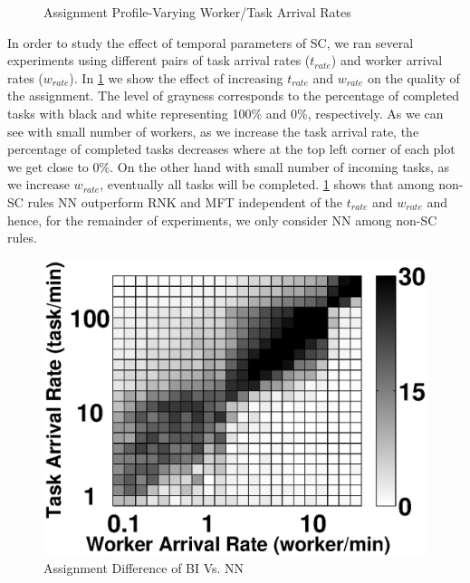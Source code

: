 \begin{figure}[h]
{    }
    \vspace{-0.15in}
    \caption{\small{Assignment Profile-Varying Worker/Task Arrival Rates}}
    \label{fig:tw_rate}
\end{figure}

In order to study the effect of temporal parameters of SC, we ran several experiments using different pairs of task arrival rates ($t_{rate}$) and worker arrival rates ($w_{rate}$). In \cref{fig:tw_rate} we show the effect of increasing $t_{rate}$ and $w_{rate}$ on the quality of the assignment. The level of grayness corresponds to the percentage of completed tasks with black and white representing 100\% and 0\%, respectively. As we can see with small number of workers, as we increase the task arrival rate, the percentage of completed tasks decreases where at the top left corner of each plot we get close to 0\%. On the other hand with small number of incoming tasks, as we increase $w_{rate}$, eventually all tasks will be completed. \cref{fig:tw_rate} shows that among non-SC rules NN outperform RNK and MFT independent of the $t_{rate}$ and $w_{rate}$ and hence, for the remainder of experiments, we only consider NN among non-SC rules.\\

\begin{figure}[h]
	\centering
	\includegraphics[width = 0.65\columnwidth]{figures/bi_nn.eps}
	\vspace{-0.1in}
	\caption{Assignment Difference of BI Vs. NN}\label{fig:bi_nn}
\end{figure}

